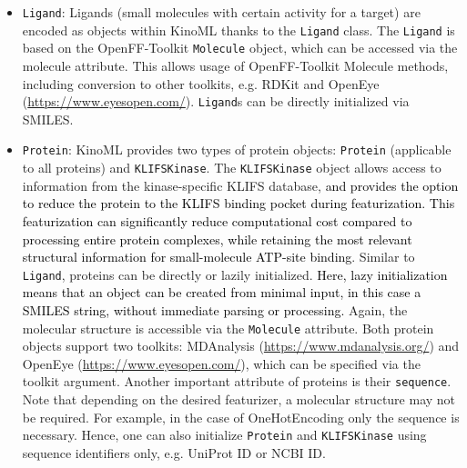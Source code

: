 \documentclass[9pt,lessons]{livecoms}
\newcommand{\revision}[1]{\textcolor{black}{#1}}
\begin{document}
\begin{itemize}
    \item \texttt{Ligand}: Ligands (small molecules with certain activity for a target) are encoded as objects within KinoML thanks to the \texttt{Ligand} class. The \texttt{Ligand} is based on the OpenFF-Toolkit \cite{boothroyd2023development} \texttt{Molecule} object, which can be accessed via the molecule attribute. This allows usage of OpenFF-Toolkit Molecule methods, including conversion to other toolkits, e.g. RDKit \cite{landrum2013rdkit} and OpenEye (\url{https://www.eyesopen.com/}). \texttt{Ligand}s can be directly initialized via SMILES. %
    \item \texttt{Protein}: KinoML provides two types of protein objects: \texttt{Protein} (applicable to all proteins) and \texttt{KLIFS\-Kinase}. The \texttt{KLIFS\-Kinase} object allows access to information from the kinase-specific KLIFS database, \revision{and  provides the option to reduce the protein to the KLIFS binding pocket during featurization. This featurization can significantly reduce computational cost compared to processing entire protein complexes, while retaining the most relevant structural information for small-molecule ATP-site binding}. Similar to \texttt{Ligand}, proteins can be directly or lazily initialized. \revision{Here, lazy initialization means that an object can be created from minimal input, in this case a SMILES string, without immediate parsing or processing.} Again, the molecular structure is accessible via the \texttt{Molecule} attribute. Both protein objects support two toolkits: MDAnalysis (\url{https://www.mdanalysis.org/}) and OpenEye (\url{https://www.eyesopen.com/}), which can be specified via the toolkit argument.  Another important attribute of proteins is their \texttt{sequence}. Note that depending on the desired featurizer, a molecular structure may not be required. For example, in the case of OneHotEncoding only the sequence is necessary. Hence, one can also initialize \texttt{Protein} and \texttt{KLIFSKinase} using sequence identifiers only, e.g. UniProt ID or NCBI ID. 
\end{itemize}
    
\end{document}
